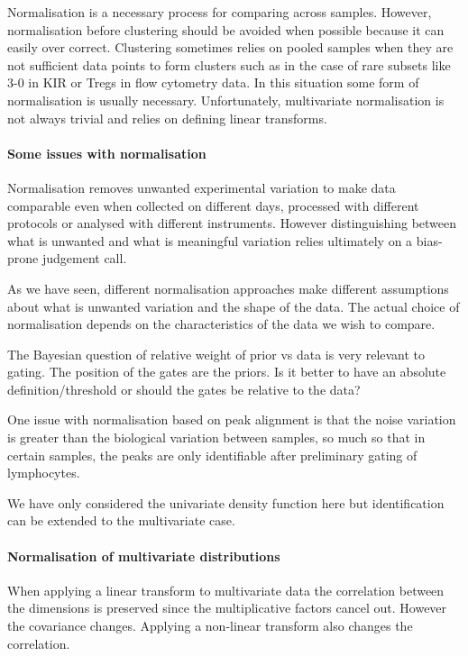 Normalisation is a necessary process for comparing across samples.
However, normalisation before clustering should be avoided when possible because 
it can easily over correct.
Clustering sometimes relies on pooled samples when they are not sufficient data points
to form clusters such as in the case of rare subsets like 3-0 in KIR or Tregs in flow cytometry data.
In this situation some form of normalisation is usually necessary.
Unfortunately, multivariate normalisation is not always trivial and relies on defining linear transforms. 



\paragraph{Some issues with normalisation}

Normalisation removes unwanted experimental variation to make data comparable even when collected on different days,
processed with different protocols or analysed with different instruments.
However distinguishing between what is unwanted and what is meaningful variation relies ultimately on a bias-prone judgement call.

As we have seen, different normalisation approaches make different assumptions about what is unwanted variation and the shape of the data.
The actual choice of normalisation depends on the characteristics of the data we wish to compare.

The Bayesian question of relative weight of prior vs data is very relevant to gating.
The position of the gates are the priors. Is it better to have an absolute definition/threshold or should the gates be relative to the data?
 
One issue with normalisation based on peak alignment is that the noise variation is greater than the biological variation between samples, so much so that in certain samples, the peaks are only identifiable after preliminary gating of lymphocytes.

We have only considered the univariate density function here but identification can be extended to the multivariate case.

\paragraph{Normalisation of multivariate distributions}

When applying a linear transform to multivariate data the correlation between the dimensions is preserved since the multiplicative factors cancel out.
However the covariance changes.
Applying a non-linear transform also changes the correlation.

